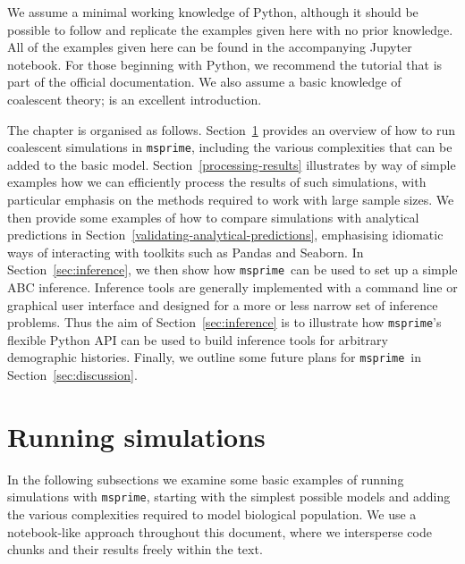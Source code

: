 \documentclass[graybox]{svmult}
\newcommand{\msprime}[0]{\texttt{msprime}}
\begin{document}
We assume a minimal working knowledge of Python, although it should be
possible to follow and replicate the examples given here with no prior
knowledge. All of the examples
given here can be found in the accompanying Jupyter notebook.
For those beginning with Python, we recommend the
tutorial that is part of the official documentation.
We also assume a basic knowledge of coalescent theory;
\cite{wakely2008coalescent} is an excellent introduction.

The chapter is organised as follows.
Section~\ref{running-simulations} provides an overview of how to run coalescent simulations in \msprime, including the various
complexities that can be added to the basic model.
Section~\ref{processing-results} illustrates by way of simple examples how we can efficiently process the results
of such simulations, with particular emphasis on the methods
required to work with large sample sizes. We then provide
some examples of how to compare simulations with analytical
predictions in Section~\ref{validating-analytical-predictions},
emphasising idiomatic ways of interacting with toolkits such as
Pandas and Seaborn. In Section~\ref{sec:inference}, we then show
how \msprime\ can be used to set up a simple ABC inference.
Inference tools are generally implemented with a command line or graphical
user interface and designed for a more or less narrow set of inference
problems. Thus the aim of Section~\ref{sec:inference} is to illustrate how
\msprime's flexible Python API can be used to build inference tools for arbitrary demographic histories.
Finally, we outline some future plans for \msprime\ in Section~\ref{sec:discussion}.

\section{Running simulations}
\label{running-simulations}
In the following subsections we examine some basic examples of running
simulations with \msprime, starting with the simplest possible models
and adding the various complexities required to model biological population.
We use a notebook-like approach throughout this document, where we
intersperse code chunks and their results freely within the text.
\end{document}
